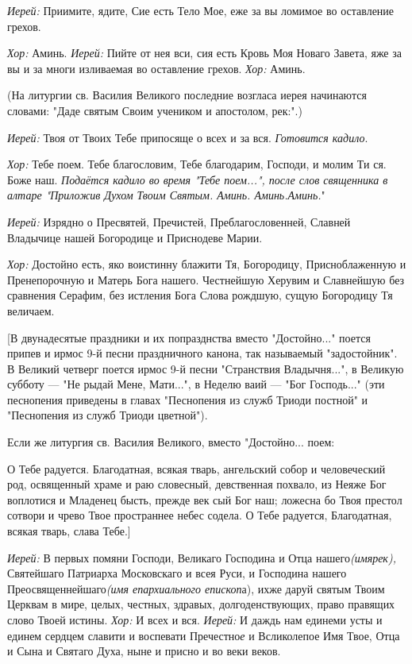 {\itshape    Иерей:} Приимите, ядите, Сие есть Тело Мое, еже за вы ломимое во оставление грехов. 

{\itshape    Хор:} Аминь. {\itshape  Иерей:} Пийте от нея вси, сия есть Кровь Моя Новаго Завета, яже за вы и за многи изливаемая во оставление грехов. {\itshape  Хор:} Аминь. 

   (На литургии св. Василия Великого последние возгласа иерея начинаются словами: "Даде святым Своим учеником и апостолом, рек:".)

 {\itshape  Иерей:} Твоя от Твоих Тебе припосяще о всех и за вся. {\itshape  Готовится кадило}. 

{\itshape  Хор:} Тебе поем. Тебе благословим, Тебе благодарим, Господи, и молим Ти ся. Боже наш. {\itshape  Подаётся кадило во время "Тебе поем...", после слов священника в алтаре "Приложив Духом Твоим Святым. Аминь. Аминь.Аминь.}"  

{\itshape    Иерей:} Изрядно о Пресвятей, Пречистей, Преблагословенней, Славней Владычице нашей Богородице и Приснодеве Марии. 

{\itshape  Хор:} Достойно есть, яко воистинну блажити Тя, Богородицу, Присноблаженную и Пренепорочную и Матерь Бога нашего. Честнейшую Херувим и Славнейшую без сравнения Серафим, без истления Бога Слова рождшую, сущую Богородицу Тя величаем.  

 [В двунадесятые праздники и их попразднства вместо "Достойно..." поется припев и ирмос 9-й песни праздничного канона, так называемый "задостойник". В Великий четверг поется ирмос 9-й песни "Странствия Владычня...", в Великую субботу — "Не рыдай Мене, Мати...", в Неделю ваий — "Бог Господь..." (эти песнопения приведены в главах "Песнопения из служб Триоди постной" и "Песнопения из служб Триоди цветной"). 

 Если же литургия св. Василия Великого, вместо "Достойно... поем: 

       О Тебе радуется. Благодатная, всякая тварь, ангельский собор и человеческий род, освященный храме и раю словесный, девственная похвало, из Неяже Бог воплотися и Младенец бысть, прежде век сый Бог наш; ложесна бо Твоя престол сотвори и чрево Твое пространнее небес содела. О Тебе радуется, Благодатная, всякая тварь, слава Тебе.]

 {\itshape  Иерей:} В первых помяни Господи, Великаго Господина и Отца нашего{\itshape  (имярек),} Святейшаго Патриарха Московскаго и всея Руси, и Господина нашего Преосвященнейшаго{\itshape  (имя епархиального епископ}а), ихже даруй святым Твоим Церквам в мире, целых, честных, здравых, долгоденствующих, право правящих слово Твоей истины. {\itshape  Хор:} И всех и вся. {\itshape  Иерей:} И даждь нам единеми усты и единем сердцем славити и воспевати Пречестно{\itshape е} и Всликолепое Имя Твое, Отца и Сына и Святаго Духа, ныне и присно и во веки веков. 

